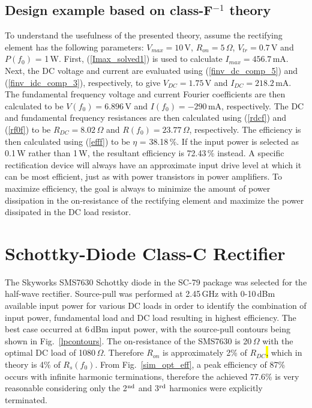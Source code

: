 \subsection {Design example based on class-F$^{-1}$ theory}

To understand the usefulness of the presented theory, assume the rectifying element has the following parameters: $V_{max} = 10$\,V, $R_{on} = 5$\,$\Omega$, $V_{tr} = 0.7$\,V and $P(f_0)$ = 1\,W.  First, (\ref{Imax_solved1}) is used to calculate $I_{max}=456.7$\,mA. Next, the DC voltage and current are evaluated using (\ref{finv_dc_comp_5}) and (\ref{finv_idc_comp_3}), respectively, to give $V_{DC}=1.75$\,V and $I_{DC}=218.2$\,mA. The fundamental frequency voltage and current Fourier coefficients are then calculated to be $V(f_0)=6.896$\,V and $I(f_0)=-290$\,mA, respectively.  The DC and fundamental frequency resistances are then calculated using (\ref{rdcf}) and (\ref{rf0f}) to be $R_{DC}=8.02$\,$\Omega$ and $R(f_0)=23.77$\,$\Omega$, respectively.  The efficiency is then calculated using (\ref{efff}) to be $\eta$ = 38.18\,\%. If the input power is selected as 0.1\,W rather than 1\,W, the resultant efficiency is 72.43\,\% instead.  A specific rectification device will always have an approximate input drive level at which it can be most efficient, just as with power transistors in power amplifiers. To maximize efficiency, the goal is always to minimize the amount of power dissipation in the on-resistance of the rectifying element and maximize the power dissipated in the DC load resistor.









\section{Schottky-Diode Class-C Rectifier}

The Skyworks SMS7630 Schottky diode in the SC-79 package was selected for the half-wave rectifier. Source-pull was performed at 2.45\,GHz with 0-10\,dBm available input power for various DC loads in order to identify the combination of input power, fundamental load and DC load resulting in highest efficiency.  The best case occurred at 6\,dBm input power, with the source-pull contours being shown in Fig.~\ref{lpcontours}.  The on-resistance of the SMS7630 is 20\,$\Omega$ with the optimal DC load of 1080\,$\Omega$. Therefore $R_{on}$ is approximately 2\% of $R_{DC}$\hl{,} which in theory is 4\% of $R_s(f_0)$.  From Fig.~\ref{sim_opt_eff}, a peak efficiency of 87\% occurs with infinite harmonic terminations, therefore the achieved 77.6\% is very reasonable considering only the 2$^{\rm nd}$ and 3$^{\rm rd}$ harmonics were explicitly terminated.



